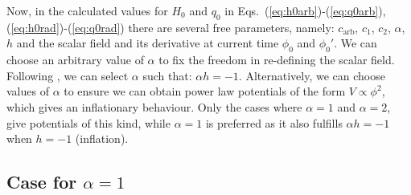 \documentclass[onecolumn,superscriptaddress,secnumarabic,amssymb,amsmath,nobibnotes,aps,prd,nofootinbib,altaffilletter]{revtex4}
\begin{document}
Now, in the calculated values for $H_0$ and $q_0$ in Eqs.~(\ref{eq:h0arb})-(\ref{eq:q0arb}), (\ref{eq:h0rad})-(\ref{eq:q0rad}) there are several free parameters, namely: $c_{\text{arb}}$, $c_1$, $c_2$, $\alpha$, $h$ and the scalar field and its derivative at current time $\phi_0$ and $\phi_0'$. 
We can choose an arbitrary value of $\alpha$ to fix the freedom in re-defining the scalar field. Following \cite{Copeland:2012qf}, we can select $\alpha$ such that: $\alpha h =-1$. Alternatively, we can choose values of $\alpha$ to ensure we can obtain power law potentials of the form $V\propto\phi^2$, which gives an inflationary behaviour.  Only the cases where $\alpha=1$ and $\alpha=2$, give potentials of this kind, while $\alpha=1$ is preferred as it also fulfills $\alpha h =-1$ when $h=-1$ (inflation).


\subsection{Case for $\alpha=1$}
\end{document}
